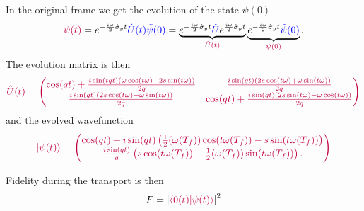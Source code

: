 In the original frame we get the evolution of the state $\psi(0)$
\begin{equation}
    \textcolor{purple}{\psi(t)}=e^{-\frac{i \omega}{2}\hat\sigma_y t} \textcolor{blue}{\hat U(t) \tilde\psi(0)} = \underbrace{e^{-\frac{i \omega}{2}\hat\sigma_y t} \textcolor{blue}{\hat U}e^{\frac{i \omega}{2}\hat\sigma_y t}}_{\textcolor{purple}{\hat U(t)}} \underbrace{e^{-\frac{i \omega}{2}\hat\sigma_y t} \textcolor{blue}{\tilde\psi(0)}}_{\textcolor{purple}{\psi(0)}}.
\end{equation}
The evolution matrix is then
\begin{equation}
    \textcolor{purple}{\hat U(t)}=\textcolor{purple}{\begin{pmatrix}
         \cos (q t)+\frac{i \sin (tqt) (\omega  \cos (t \omega )-2 s \sin (t \omega ))}{2 q} & \frac{i \sin (qt) (2 s \cos (t \omega )+\omega  \sin (t \omega ))}{2 q} \\
         \frac{i \sin (qt) (2 s \cos (t \omega )+\omega  \sin (t \omega ))}{2 q} & \cos (qt)+\frac{i \sin (qt) (2 s \sin (t \omega )-\omega  \cos (t \omega ))}{2 q} \\
        \end{pmatrix}}
\end{equation}
and the evolved wavefunction
\begin{equation}
    \textcolor{purple}{\ket{\psi(t)}}=\textcolor{purple}{\begin{pmatrix}
        \cos (qt)+i \sin (qt) \left(\frac{1}{2} (\omega(T_f) ) \cos (t \omega(T_f) )-s \sin (t \omega(T_f) )\right)\\
        \frac{i \sin (qt)}{q} \left(s \cos (t \omega(T_f) )+\frac{1}{2} (\omega(T_f) ) \sin (t \omega(T_f) )\right).
    \end{pmatrix}}
\end{equation}

Fidelity during the transport is then
\begin{equation}
    F=\left|\textcolor{purple}{\braket{0(t)|\psi(t)}}\right|^2
\end{equation}